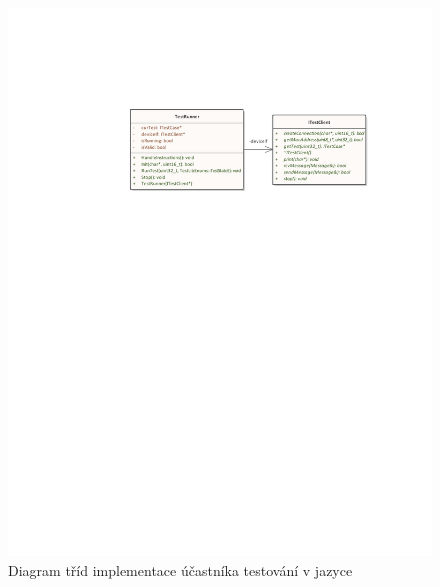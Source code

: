 \begin{figure}[p!]
    \centering 
    \includegraphics[width=\textwidth]{assets/img/class_diagram/client-cpp.pdf}
    \caption{Diagram tříd implementace účastníka testování v jazyce \protect\cpp{}}
    \label{fig:test_client_cpp}
\end{figure}

